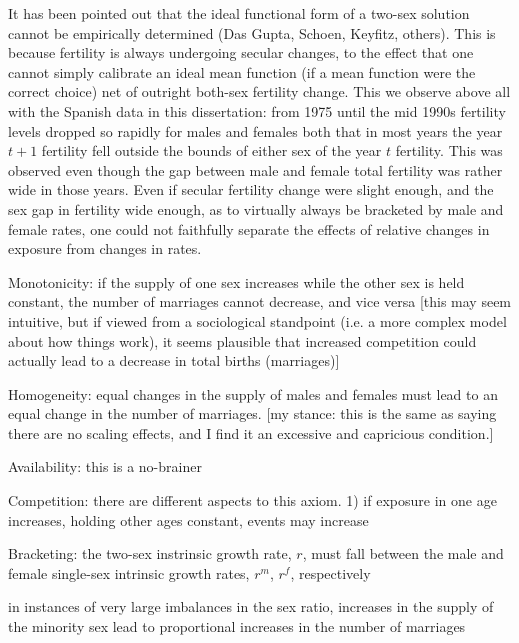  \FloatBarrier
It has been pointed out that the ideal functional form of a two-sex solution
cannot be empirically determined (Das Gupta, Schoen, Keyfitz, others). This is
because fertility is always undergoing secular changes, to the effect that
one cannot simply calibrate an ideal mean function (if a mean function were the
correct choice) net of outright both-sex fertility change. This we observe above
all with the Spanish data in this dissertation: from 1975 until the mid 1990s
fertility levels dropped so rapidly for males and females both that in most
years the year $t+1$ fertility fell outside the bounds of either sex of the year
$t$ fertility. This was observed even though the gap between male and female
total fertility was rather wide in those years. Even if secular fertility change
were slight enough, and the sex gap in fertility wide enough, as to virtually
always be bracketed by male and female rates, one could not faithfully separate
the effects of relative changes in exposure from changes in rates.


Monotonicity: if the supply of one sex increases while the other sex is held
constant, the number of marriages cannot decrease, and vice versa [this may
seem intuitive, but if viewed from a sociological standpoint (i.e. a more
complex model about how things work), it seems plausible that increased
competition could actually lead to a decrease in total births (marriages)]

Homogeneity: equal changes in the supply of males and females must lead to an
equal change in the number of marriages. [my stance: this is the same as saying
there are no scaling effects, and I find it an excessive and
capricious condition.]

Availability: this is a no-brainer

Competition: there are different aspects to this axiom. 1) if exposure in one
age increases, holding other ages constant, events may increase

Bracketing: the two-sex instrinsic growth rate, $r$, must fall between the male
and female single-sex intrinsic growth rates, $r^m$, $r^f$, respectively

in instances of very large imbalances in the sex ratio, increases in the supply
of the minority sex lead to proportional increases in the number of marriages
